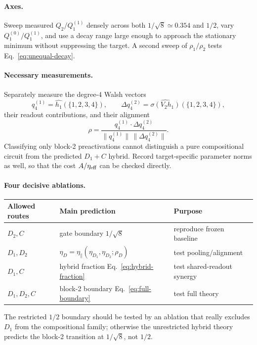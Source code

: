 \documentclass[11pt]{article}
\newcommand{\eone}{\eta_{D_1}}
\newcommand{\etwo}{\eta_{D_2}}
\begin{document}
\paragraph{Axes.}
Sweep measured \(Q_2/Q_1^{(1)}\) densely across both \(1/\sqrt8\simeq0.354\) and \(1/2\), vary
\(Q_1^{(0)}/Q_1^{(1)}\), and use a decay range large enough to approach the stationary
minimum without suppressing the target.  A second sweep of \(\rho_1/\rho_2\) tests
Eq.~\eqref{eq:unequal-decay}.

\paragraph{Necessary measurements.}
Separately measure the degree-4 Walsh vectors
\begin{equation}
q_4^{(1)}=\widehat{h_1}(\{1,2,3,4\}),
\qquad
\Delta q_4^{(2)}=\widehat{\sigma(V_2h_1)}(\{1,2,3,4\}),
\end{equation}
their readout contributions, and their alignment
\begin{equation}
\rho=\frac{q_4^{(1)}\cdot\Delta q_4^{(2)}}
{\|q_4^{(1)}\|\,\|\Delta q_4^{(2)}\|}.
\end{equation}
Classifying only block-2 preactivations cannot distinguish a pure compositional circuit from
the predicted \(D_1+C\) hybrid.  Record target-specific parameter norms as well, so that the
cost \(A/\eta_{\rm eff}\) can be checked directly.

\paragraph{Four decisive ablations.}
\begin{center}
\begin{tabular}{@{}lll@{}}
\toprule
Allowed routes & Main prediction & Purpose\\
\midrule
\(D_2,C\) & gate boundary \(1/\sqrt8\) & reproduce frozen baseline\\
\(D_1,D_2\) & \(\eta_D=\eta_{\parallel}(\eone,\etwo;\rho_D)\) & test pooling/alignment\\
\(D_1,C\) & hybrid fraction Eq.~\eqref{eq:hybrid-fraction} & test shared-readout synergy\\
\(D_1,D_2,C\) & block-2 boundary Eq.~\eqref{eq:full-boundary} & test full theory\\
\bottomrule
\end{tabular}
\end{center}
The restricted \(1/2\) boundary should be tested by an ablation that really excludes \(D_1\)
from the compositional family; otherwise the unrestricted hybrid theory predicts the block-2
transition at \(1/\sqrt8\), not \(1/2\).
\end{document}
